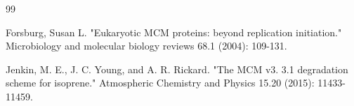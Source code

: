 \newpage

\makeatletter
\renewcommand\@biblabel[1]{[\makebox[1em][c]{#1}]}
\makeatother

\begin{thebibliography}{99}%
	
	\setlength{\itemsep}{3mm}



Forsburg, Susan L. "Eukaryotic MCM proteins: beyond replication initiation." Microbiology and molecular biology reviews 68.1 (2004): 109-131.


Jenkin, M. E., J. C. Young, and A. R. Rickard. "The MCM v3. 3.1 degradation scheme for isoprene." Atmospheric Chemistry and Physics 15.20 (2015): 11433-11459.

















	
	

\end{thebibliography}
